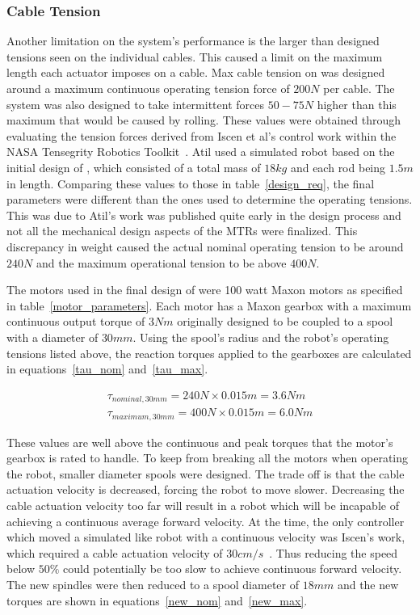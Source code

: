 \subsubsection{Cable Tension}
Another limitation on the system's performance is the larger than designed tensions seen on the individual cables.
This caused a limit on the maximum length each actuator imposes on a cable. 
Max cable tension on \SB{} was designed around a maximum continuous operating tension force of \(200N\) per cable.
The system was also designed to take intermittent forces \(50-75N\) higher than this maximum that would be caused by rolling.
These values were obtained through evaluating the tension forces derived from Iscen et al's control work within the NASA Tensegrity Robotics Toolkit~\cite{iscen2014flop}.
Atil used a simulated robot based on the initial design of \SB{}, which consisted of a total mass of \(18kg\) and each rod being \(1.5m\) in length. 
Comparing these values to those in table~\ref{design_req}, the final \SB{} parameters were different than the ones used to determine the operating tensions.
This was due to Atil's work was published quite early in the design process and not all the mechanical design aspects of the MTRs were finalized.
This discrepancy in weight caused the actual nominal operating tension to be around \(240N\) and the maximum operational tension to be above \(400N\).

The motors used in the final design of \SB{} were 100 watt Maxon motors as specified in table~\ref{motor_parameters}.
Each motor has a Maxon gearbox with a maximum continuous output torque of \(3Nm\) originally designed to be coupled to a spool with a diameter of \(30mm\).
Using the spool's radius and the robot's operating tensions listed above, the reaction torques applied to the gearboxes are calculated in equations~\ref{tau_nom} and~\ref{tau_max}.

\begin{align}
\tau_{nominal, 30mm} = 240N \times 0.015m = 3.6Nm \label{tau_nom} \\
\tau_{maximum, 30mm} = 400N \times 0.015m = 6.0Nm \label{tau_max}
\end{align}

These values are well above the continuous and peak torques that the motor's gearbox is rated to handle.
To keep from breaking all the motors when operating the robot, smaller diameter spools were designed. 
The trade off is that the cable actuation velocity is decreased, forcing the robot to move slower.
Decreasing the cable actuation velocity too far will result in a robot which will be incapable of achieving a continuous average forward velocity.
At the time, the only controller which moved a simulated \SB{} like robot with a continuous velocity was Iscen's work, which required a cable actuation velocity of \(30 cm/s\)~\cite{iscen2014flop}.
Thus reducing the speed below \(50\%\) could potentially be too slow to achieve continuous forward velocity.
The new spindles were then reduced to a spool diameter of \(18mm\) and the new torques are shown in equations~\ref{new_nom} and~\ref{new_max}.

